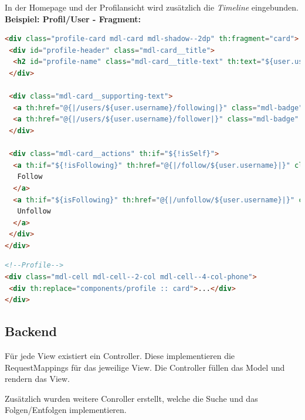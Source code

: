\documentclass[
    a4paper
]{scrreprt}
\begin{document}
	In der Homepage und der Profilansicht wird zusätzlich die \textit{Timeline} eingebunden.\\
	
	\textbf{Beispiel: Profil/User - Fragment:}
	\begin{lstlisting}[language=html]
<div class="profile-card mdl-card mdl-shadow--2dp" th:fragment="card">
 <div id="profile-header" class="mdl-card__title">
  <h2 id="profile-name" class="mdl-card__title-text" th:text="${user.username}"></h2>
 </div>
		
 <div class="mdl-card__supporting-text">
  <a th:href="@{|/users/${user.username}/following|}" class="mdl-badge" th:attr="data-badge=${followingCnt}">Following</a>
  <a th:href="@{|/users/${user.username}/follower|}" class="mdl-badge" th:attr="data-badge=${followerCnt}">Follower</a>
 </div>
		
 <div class="mdl-card__actions" th:if="${!isSelf}">
  <a th:if="${!isFollowing}" th:href="@{|/follow/${user.username}|}" class="mdl-button mdl-button--raised mdl-button--colored mdl-js-button mdl-js-ripple-effect" style="width: 100%;">
   Follow
  </a>
  <a th:if="${isFollowing}" th:href="@{|/unfollow/${user.username}|}" class="warn mdl-button mdl-button--raised mdl-js-button mdl-js-ripple-effect" style="width: 100%;">
   Unfollow
  </a>
 </div>
</div>
	\end{lstlisting}
	\begin{lstlisting}[language=html]
<!--Profile-->
<div class="mdl-cell mdl-cell--2-col mdl-cell--4-col-phone">
 <div th:replace="components/profile :: card">...</div>
</div>
	\end{lstlisting}

    \subsection{Backend}
	Für jede View existiert ein Controller. Diese implementieren die RequestMappings für das jeweilige View. Die Controller füllen das Model und rendern das View.
	
	Zusätzlich wurden weitere Conroller erstellt, welche die Suche und das Folgen/Entfolgen implementieren.\\
	
\end{document}
